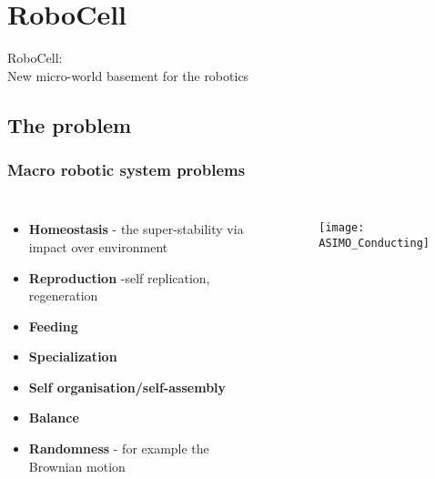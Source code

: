 \section{RoboCell}
\begin{frame}
  RoboCell:\\
  New micro-world basement for the robotics
\end{frame}

\subsection{The problem} %
\begin{frame}
\frametitle{Macro robotic system problems}
\begin{columns}[c] %

\begin{itemize}
\item \textbf{Homeostasis} - the super-stability via impact over environment 
\item \textbf{Reproduction} -self replication, regeneration
\item \textbf{Feeding}
\item \textbf{Specialization}
\item \textbf{Self organisation/self-assembly}
\item \textbf{Balance}
\item \textbf{Randomness} - for example the Brownian motion
\end{itemize}

\begin{figure}
\texttt{[image: ASIMO\_Conducting]}
\end{figure}
\end{columns}
\end{frame}

